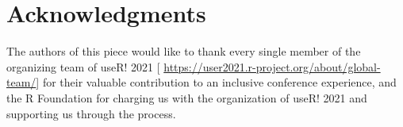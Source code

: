 \documentclass[10pt,letterpaper]{article}
\begin{document}


\section*{Acknowledgments}
The authors of this piece would like to thank every single member of the organizing team of useR! 2021 [ \url{https://user2021.r-project.org/about/global-team/}] for their valuable contribution to an inclusive conference experience, and the R Foundation for charging us with the organization of useR! 2021 and supporting us through the process. 








\end{document}
